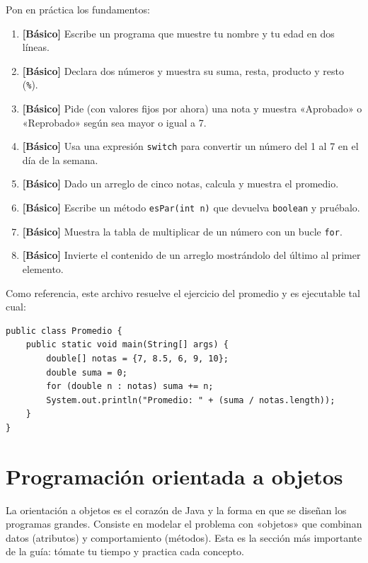 \documentclass[11pt]{article}
\begin{document}
Pon en práctica los fundamentos:

\begin{enumerate}[leftmargin=1.7em,itemsep=3pt,topsep=2pt]
\item \textbf{[Básico]} Escribe un programa que muestre tu nombre y tu edad en dos líneas.
\item \textbf{[Básico]} Declara dos números y muestra su suma, resta, producto y resto (\texttt{\%}).
\item \textbf{[Básico]} Pide (con valores fijos por ahora) una nota y muestra «Aprobado» o «Reprobado» según sea mayor o igual a 7.
\item \textbf{[Básico]} Usa una expresión \texttt{switch} para convertir un número del 1 al 7 en el día de la semana.
\item \textbf{[Básico]} Dado un arreglo de cinco notas, calcula y muestra el promedio.
\item \textbf{[Básico]} Escribe un método \texttt{es\allowbreak{}Par(int n)} que devuelva \texttt{boolean} y pruébalo.
\item \textbf{[Básico]} Muestra la tabla de multiplicar de un número con un bucle \texttt{for}.
\item \textbf{[Básico]} Invierte el contenido de un arreglo mostrándolo del último al primer elemento.
\end{enumerate}
Como referencia, este archivo resuelve el ejercicio del promedio y es ejecutable tal cual:

\begin{cajacodigo}
\begin{lstlisting}[style=java]
public class Promedio {
    public static void main(String[] args) {
        double[] notas = {7, 8.5, 6, 9, 10};
        double suma = 0;
        for (double n : notas) suma += n;
        System.out.println("Promedio: " + (suma / notas.length));
    }
}
\end{lstlisting}
\end{cajacodigo}
\vspace{2pt}
\section{Programación orientada a objetos}
La orientación a objetos es el corazón de Java y la forma en que se diseñan los programas grandes. Consiste en modelar el problema con «objetos» que combinan datos (atributos) y comportamiento (métodos). Esta es la sección más importante de la guía: tómate tu tiempo y practica cada concepto.
\end{document}
